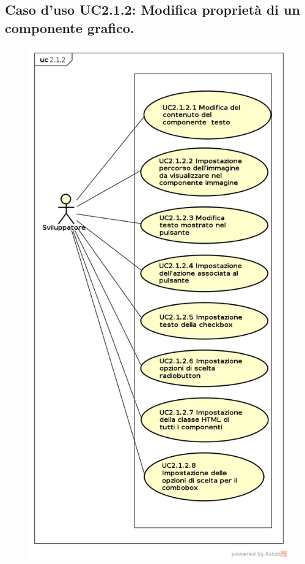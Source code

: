 \subsection{Caso d'uso UC2.1.2: Modifica proprietà di un componente grafico.}
\begin{itemize}
   \FloatBarrier
   \begin{figure}[ht]
   \centering
   \includegraphics[scale=0.45]{img/2_1_2.png}

\end{figure}
\end{itemize}

